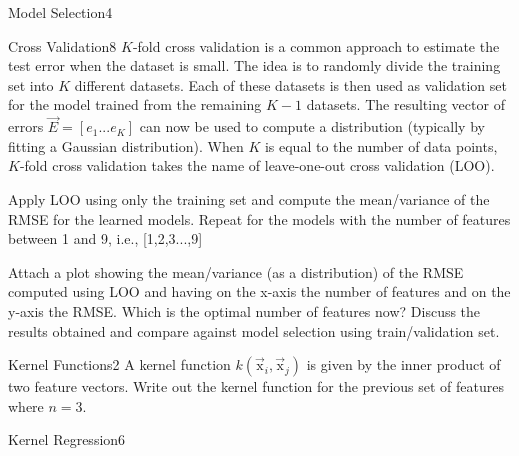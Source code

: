 \begin{questions}
\begin{question}{Model Selection}{4}
\begin{answer}
\end{answer}
	\end{question}
	
	
	\begin{question}{Cross Validation}{8}
		$K$-fold cross validation is a common approach to estimate the test error when the dataset is small.
		The idea is to randomly divide the training set into $K$ different datasets.
		Each of these datasets is then used as validation set for the model trained from the remaining $K-1$ datasets.
		The resulting vector of errors $\vec E = [ e_1... e_K ]$ can now be used to compute a distribution (typically by fitting a Gaussian distribution).
		When $K$ is equal to the number of data points, $K$-fold cross validation takes the name of leave-one-out cross validation (LOO).
		
		Apply LOO using only the training set and compute the mean/variance of the RMSE for the learned models. 
		Repeat for the models with the number of features between 1 and 9, i.e.,  [1,2,3...,9]
		
		Attach a plot showing the mean/variance (as a distribution) of the RMSE computed using LOO and having on the x-axis the number of features and on the y-axis the RMSE.
		Which is the optimal number of features now? 
		Discuss the results obtained and compare against model selection using train/validation set.
		
\begin{answer}
\end{answer}
	\end{question}
	
	
	
	
	
	\begin{question}{Kernel Functions}{2}
		A kernel function $k(\vec{\mbox{x}}_{i},\vec{\mbox{x}}_{j})$ is given by the inner product of two feature vectors. Write out the kernel function for the previous set of features where $n=3$.
		
\begin{answer}
\end{answer}
	\end{question}
	
	
	
	\begin{question}{Kernel Regression}{6}
		

\end{question}
\end{questions}
